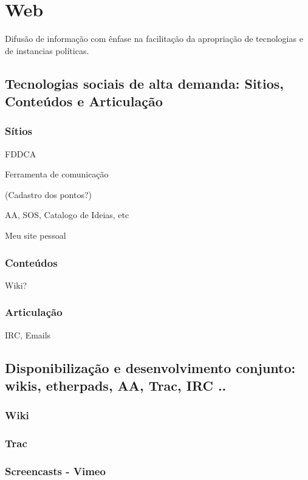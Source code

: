   \section{Web}

  Difusão de informação com ênfase na facilitação
  da apropriação de tecnologias e de instancias políticas.

      \subsection{Tecnologias sociais de alta demanda: Sitios, Conteúdos e Articulação}

      \subsubsection{Sítios}

      FDDCA

      Ferramenta de comunicação

      (Cadastro dos pontos?)

      AA, SOS, Catalogo de Ideias, etc

      Meu site pessoal


      \subsubsection{Conteúdos}

      Wiki?

      \subsubsection{Articulação}

      IRC, Emails

\subsection{Disponibilização e desenvolvimento conjunto: wikis, etherpads, AA, Trac, IRC ..}

\subsubsection{Wiki}

\subsubsection{Trac}

\subsubsection{Screencasts - Vimeo}


